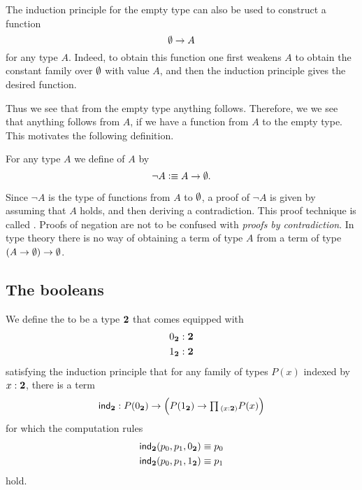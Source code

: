 The induction principle for the empty type can also be used to construct a function
\begin{equation*}
  \emptyset\to A
\end{equation*}
for any type $A$. Indeed, to obtain this function one first weakens $A$ to obtain the constant family over $\emptyset$ with value $A$, and then the induction principle gives the desired function.

Thus we see that from the empty type anything follows. Therefore, we we see that anything follows from $A$, if we have a function from $A$ to the empty type. This motivates the following definition.

\begin{defn}
  For any type $A$ we define  of $A$ by
  \begin{equation*}
    \neg A\vcentcolon\equiv A\to\emptyset.
  \end{equation*}
\end{defn}

Since $\neg A$ is the type of functions from $A$ to $\emptyset$, a proof of $\neg A$ is given by assuming that $A$ holds, and then deriving a contradiction. This proof technique is called . Proofs of negation are not to be confused with \emph{proofs by contradiction}. In type theory there is no way of obtaining a term of type $A$ from a term of type $(A\to \emptyset)\to\emptyset$.

\subsection{The booleans}

\begin{defn}
We define the  to be a type $\mathbf{2}$ that comes equipped with
\begin{align*}
{0_{\ensuremath{\mathbf{2}}}} & : \mathbf{2} \\
{1_{\mathbf{2}}} & : \mathbf{2}
\end{align*}
satisfying the induction principle that for any family of types $P(x)$ indexed by $x:\mathbf{2}$, there is a term
\begin{equation*}
\indbool : P(\bfalse)\to \Big(P(\btrue)\to \prd{x:\bool}P(x)\Big)
\end{equation*}
for which the computation rules
\begin{align*}
\mathsf{ind}_{\mathbf{2}}(p_0,p_1,{0_{\mathbf{2}}}) & \equiv p_0 \\
\mathsf{ind}_{\mathbf{2}}(p_0,p_1,{1_{\mathbf{2}}}) & \equiv p_1
\end{align*}
hold.
\end{defn}

